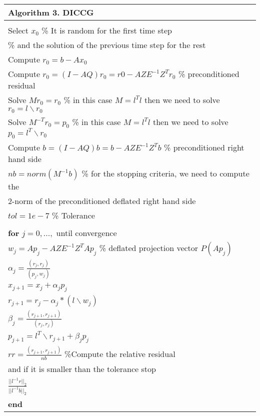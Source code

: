 \documentclass[12pt]{report}
\begin{document}
\begin{table}[!h]
\begin{tabular}{ |l | } 
\hline
  \textbf{Algorithm 3. DICCG} \\
  \hline
 \hline
\\
Select $x_0$ \% It is random for the first time step\\
\hspace{1.7cm} \% and the solution of the previous time step for the rest\\
Compute $r_0=b-Ax_0$ \\
Compute $r_0=(I-AQ)r_0=r0-AZE^{-1}Z^Tr_0$ \% preconditioned residual\\
Solve $Mr_0=r_0$  \% in this case $M= l^T l$ then we need to solve $r_0=l \backslash r_0$ \\
Solve $M^{-T}r_0=p_0$  \% in this case $M= l^T l$ then we need to solve $p_0=l^{T} \backslash r_0$ \\
Compute $b=(I-AQ)b=b-AZE^{-1}Z^Tb$ \% preconditioned right hand side\\
$nb=norm(M^{-1}b)$  \% for the stopping criteria, we need to compute the \\
\hspace{2.5cm} 2-norm of the preconditioned deflated right hand side \\
$tol = 1e−7$ \% Tolerance\\
\\
\hspace{0.5cm}\textbf{for} $j=0,...,$ until convergence\\
 \hspace{1cm} $w_j=Ap_j-AZE^{-1}Z^TAp_j$ \% deflated projection vector $P(Ap_j)$\\ 
 \hspace{1cm}$\alpha_j=\frac{(r_j,r_j)}{(p_j,w_j)}$\\
 \hspace{1cm} $x_{j+1}=x_j+\alpha_jp_j$\\
 \hspace{1cm} $r_{j+1}=r_j-\alpha_j*(l\backslash w_j)$ \\
 \hspace{1cm} $\beta_j=\frac{(r_{j+1},r_{j+1})}{(r_j,r_j)}$\\ 
 \hspace{1cm} $p_{j+1}=l^{T}\backslash r_{j+1}+\beta_jp_j$ \\
\hspace{1cm} $rr=\frac{(r_{j+1},r_{j+1})}{nb}$ \%Compute the relative residual\\
\hspace{4cm} and if it is smaller than the tolerance stop\\
\hspace{4cm} $\frac{||l^{-1}r||_2}{||l^{-1}b||_2}$\\
\hspace{0.5cm}\textbf{end}\\
\hline
\end{tabular}
\end{table}
\newpage
\end{document}
